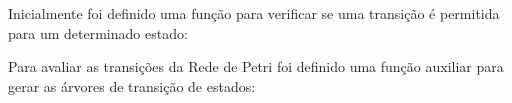\documentclass[a4paper,11pt]{article}
\begin{document}
Inicialmente foi definido uma função para verificar se uma transição é permitida para um determinado estado:


Para avaliar as transições da Rede de Petri foi definido uma função auxiliar para gerar as árvores de transição de estados:


\end{document}
